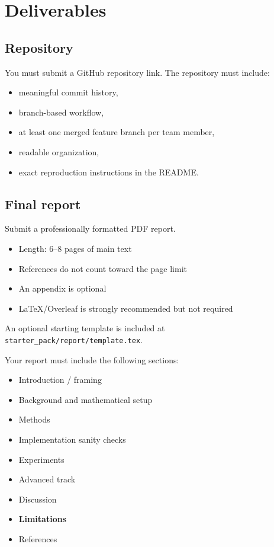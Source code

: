 \documentclass[11pt]{article}
\newcommand{\filepath}[1]{\nolinkurl{#1}}
\begin{document}
\section{Deliverables}

\subsection{Repository}

You must submit a GitHub repository link. The repository must include:

\begin{itemize}
    \item meaningful commit history,
    \item branch-based workflow,
    \item at least one merged feature branch per team member,
    \item readable organization,
    \item exact reproduction instructions in the README.
\end{itemize}

\subsection{Final report}

Submit a professionally formatted PDF report.

\begin{itemize}
    \item Length: 6--8 pages of main text
    \item References do not count toward the page limit
    \item An appendix is optional
    \item LaTeX/Overleaf is strongly recommended but not required
\end{itemize}

An optional starting template is included at \filepath{starter_pack/report/template.tex}.

Your report must include the following sections:

\begin{itemize}
    \item Introduction / framing
    \item Background and mathematical setup
    \item Methods
    \item Implementation sanity checks
    \item Experiments
    \item Advanced track
    \item Discussion
    \item \textbf{Limitations}
    \item References
\end{itemize}
\end{document}
